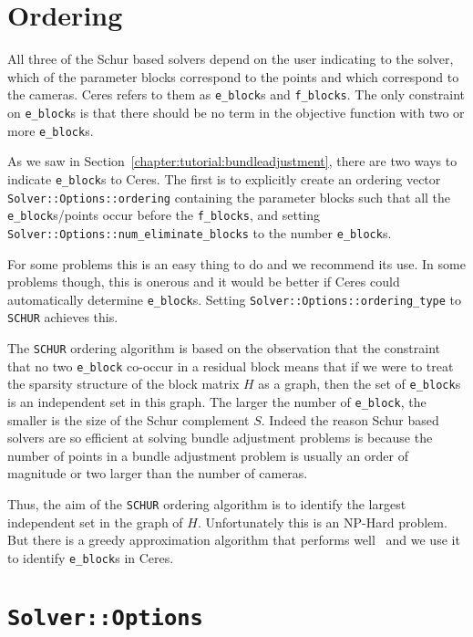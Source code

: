 \section{Ordering}
All three of the Schur based solvers depend on the user indicating to the solver, which of the parameter blocks correspond to the points and which correspond to the cameras. Ceres refers to them as \texttt{e\_block}s and \texttt{f\_blocks}. The only constraint on \texttt{e\_block}s is that there should be no term in the objective function with two or more \texttt{e\_block}s.

As we saw in Section~\ref{chapter:tutorial:bundleadjustment}, there are two ways to indicate \texttt{e\_block}s to Ceres. The first is to explicitly create an ordering vector \texttt{Solver::Options::ordering} containing the parameter blocks such that all the \texttt{e\_block}s/points occur before the \texttt{f\_blocks}, and setting \texttt{Solver::Options::num\_eliminate\_blocks} to the number \texttt{e\_block}s.

For some problems this is an easy thing to do and we recommend its use. In some problems though, this is onerous and it would be better if Ceres could automatically determine \texttt{e\_block}s. Setting \texttt{Solver::Options::ordering\_type} to \texttt{SCHUR} achieves this.

The \texttt{SCHUR} ordering algorithm is based on the observation that
the constraint that no two \texttt{e\_block} co-occur in a residual
block means that if we were to treat the sparsity structure of the
block matrix $H$ as a graph, then the set of \texttt{e\_block}s is an
independent set in this graph. The larger the number of
\texttt{e\_block}, the smaller is the size of the Schur complement $S$. Indeed the reason Schur based solvers are so efficient at solving bundle adjustment problems is because the number of points in a bundle adjustment problem is usually an order of magnitude or two larger than the number of cameras.

Thus, the aim of the \texttt{SCHUR} ordering algorithm is to identify the largest independent set in the graph of $H$. Unfortunately this is an NP-Hard problem. But there is a  greedy approximation algorithm that performs well~\cite{li2007miqr} and we use it to identify \texttt{e\_block}s in Ceres.

\section{\texttt{Solver::Options}}

